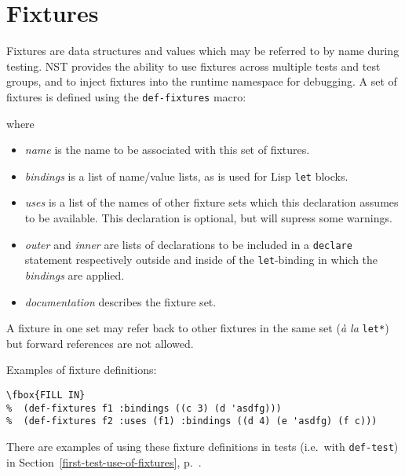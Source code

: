 \section{Fixtures}
\label{fixtures}
Fixtures are data structures and values which may be
referred to by name during testing.  NST provides the ability to use
fixtures across multiple tests and test groups, and to inject fixtures
into the runtime namespace for debugging.
A set of fixtures is defined using the \texttt{def-fixtures}
macro:

where 
\begin{itemize}
\item \textit{name} is the name to be associated with this set of
  fixtures.
\item \textit{bindings} is a list of name/value lists, as is used for
  Lisp \texttt{let} blocks.
\item \textit{uses} is a list of the names of other fixture sets which
  this declaration assumes to be available.  This declaration is
  optional, but will supress some warnings.
\item \textit{outer} and \textit{inner} are lists of declarations to
  be included in a \texttt{declare} statement respectively outside and
  inside of the \texttt{let}-binding in which the \textit{bindings}
  are applied.
\item \textit{documentation} describes the fixture set.
\end{itemize}
A fixture in one set may refer back to other fixtures in the same set
(\emph{\`a la} \texttt{let*}) but forward references are not allowed.

Examples of fixture definitions:
\begin{verbatim}
\fbox{FILL IN}
%  (def-fixtures f1 :bindings ((c 3) (d 'asdfg)))
%  (def-fixtures f2 :uses (f1) :bindings ((d 4) (e 'asdfg) (f c)))
\end{verbatim}
There are examples of using these fixture definitions in tests (i.e.\
with \texttt{def-test}) in Section~\ref{first-test-use-of-fixtures},
p.~\pageref{first-test-use-of-fixtures}.

